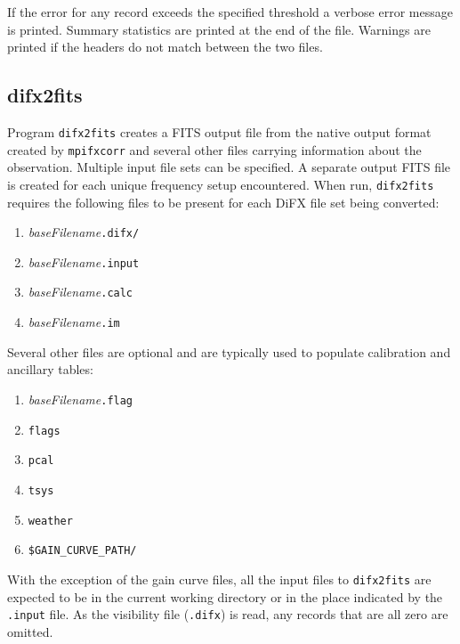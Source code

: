 \noindent 
If the error for any record exceeds the specified threshold a verbose error message is printed.
Summary statistics are printed at the end of the file.
Warnings are printed if the headers do not match between the two files.





\subsection{difx2fits} \label{sec:difx2fits}

Program {\tt difx2fits} creates a FITS output file from the native output format created by {\tt mpifxcorr} and several other files carrying information about the observation.
Multiple input file sets can be specified.
A separate output FITS file is created for each unique frequency setup encountered.
When run, {\tt difx2fits} requires the following files to be present for each DiFX file set being converted:
\begin{enumerate}
\item {\em baseFilename}{\tt .difx/}
\item {\em baseFilename}{\tt .input}
\item {\em baseFilename}{\tt .calc}
\item {\em baseFilename}{\tt .im}
\end{enumerate}
Several other files are optional and are typically used to populate calibration and ancillary tables:
\begin{enumerate}
\item {\em baseFilename}{\tt .flag} 
\item {\tt flags}
\item {\tt pcal}
\item {\tt tsys}
\item {\tt weather}
\item {\tt \$GAIN\_CURVE\_PATH/}
\end{enumerate}
With the exception of the gain curve files, all the input files to {\tt difx2fits} are expected to be in the current working directory or in the place indicated by the {\tt .input} file.
As the visibility file ({\tt .difx}) is read, any records that are all zero are omitted.

